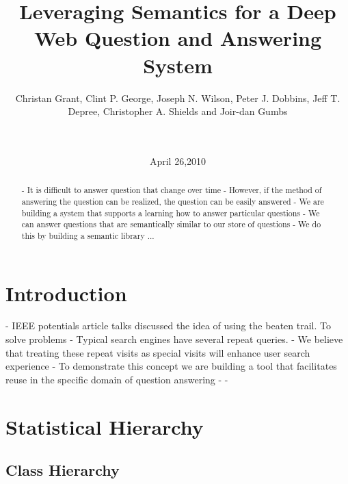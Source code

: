 \documentclass{www2010-submission}
\begin{document}
\title{Leveraging Semantics for a Deep Web Question and Answering System} 
\author{
	 \alignauthor Christan Grant, Clint P. George, Joseph N. Wilson, Peter J. Dobbins, Jeff T. Depree, Christopher A. Shields and Joir-dan Gumbs\\
	  \\  \\
}

\date{April 26,2010}

\maketitle

\begin{abstract}
- It is difficult to answer question that change over time
- However, if the method of answering the question can be realized, the question can be easily answered
- We are building a system that supports a learning how to answer particular questions
- We can answer questions that are semantically similar to our store of questions
- We do this by building a semantic library ...
\end{abstract}




\section{Introduction}
- IEEE potentials article talks discussed the idea of using the beaten trail. To solve problems
- Typical search engines have several repeat queries.
- We believe that treating these repeat visits as special visits will enhance user search experience
- To demonstrate this concept we are building a tool that facilitates reuse in the specific domain of question answering
- 
- 

\section{Statistical Hierarchy}
\subsection*{Class Hierarchy}
\end{document}

